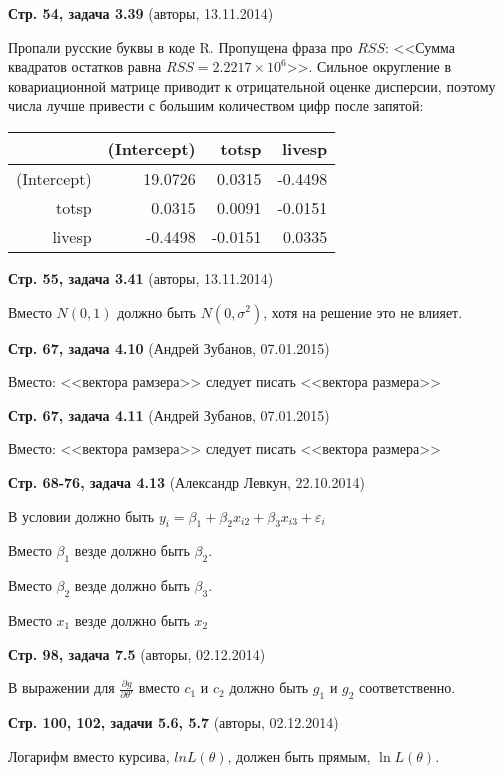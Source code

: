 \documentclass{article}
\newcommand{\erroronpage}[4]{\textbf{Стр. #1, #2} (#3, #4)}
\begin{document}
\erroronpage{54}{задача 3.39}{авторы}{13.11.2014}

Пропали русские буквы в коде R. Пропущена фраза про $RSS$:
<<Сумма квадратов остатков равна $RSS=\ensuremath{2.2217\times 10^{6}}$>>. 
Сильное округление в ковариационной матрице приводит к отрицательной оценке дисперсии, поэтому числа лучше привести с большим количеством цифр после запятой:

\begin{table}[ht]
\centering
\begin{tabular}{rrrr}
  \hline
 & (Intercept) & totsp & livesp \\ 
  \hline
(Intercept) & 19.0726 & 0.0315 & -0.4498 \\ 
  totsp & 0.0315 & 0.0091 & -0.0151 \\ 
  livesp & -0.4498 & -0.0151 & 0.0335 \\ 
   \hline
\end{tabular}
\end{table}


\erroronpage{55}{задача 3.41}{авторы}{13.11.2014}

Вместо $N(0, 1)$ должно быть $N(0, \sigma^2)$, хотя на решение это не влияет.

\erroronpage{67}{задача 4.10}{Андрей Зубанов}{07.01.2015}

Вместо: <<вектора рамзера>> следует писать <<вектора размера>> 

\erroronpage{67}{задача 4.11}{Андрей Зубанов}{07.01.2015}

Вместо: <<вектора рамзера>> следует писать <<вектора размера>> 

\erroronpage{68-76}{задача 4.13}{Александр Левкун}{22.10.2014}

В условии должно быть $y_i=\beta_1+\beta_2 x_{i2} + \beta_3 x_{i3}+\varepsilon_i$

Вместо $\beta_1$ везде должно быть $\beta_2$.

Вместо $\beta_2$ везде должно быть $\beta_3$.

Вместо $x_1$ везде должно быть $x_2$

\erroronpage{98}{задача 7.5}{авторы}{02.12.2014}

В выражении для $\frac{\partial g}{\partial \theta'}$ вместо $c_1$ и $c_2$ должно быть $g_1$ и $g_2$ соответственно.

\erroronpage{100, 102}{задачи 5.6, 5.7}{авторы}{02.12.2014}

Логарифм вместо курсива, $ln L(\theta)$, должен быть прямым, $\ln L(\theta)$.
\end{document}
